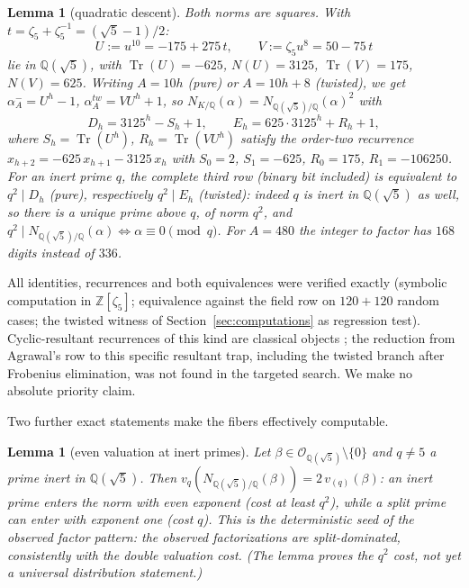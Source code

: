 \documentclass[11pt]{amsart}
\newtheorem{lemma}[theorem]{Lemma}
\theoremstyle{definition}
\theoremstyle{remark}
\newcommand{\Z}{\mathbb{Z}}
\newcommand{\Q}{\mathbb{Q}}
\begin{document}
\begin{lemma}[quadratic descent]\label{lem:descent}
Both norms are squares. With $t = \zeta_5 + \zeta_5^{-1} = (\sqrt5-1)/2$:
\[
U := u^{10} = -175 + 275\,t, \qquad V := \zeta_5 u^8 = 50 - 75\,t
\]
lie in $\Q(\sqrt5)$, with $\operatorname{Tr}(U) = -625$, $N(U) = 3125$,
$\operatorname{Tr}(V) = 175$, $N(V) = 625$. Writing $A = 10h$ (pure) or
$A = 10h + 8$ (twisted), we get $\alpha^-_A = U^h - 1$, $\alpha^{tw}_A =
V U^h + 1$, so $N_{K/\Q}(\alpha) = N_{\Q(\sqrt5)/\Q}(\alpha)^2$ with
\[
D_h = 3125^h - S_h + 1,
\qquad
E_h = 625 \cdot 3125^h + R_h + 1,
\]
where $S_h = \operatorname{Tr}(U^h)$, $R_h = \operatorname{Tr}(VU^h)$
satisfy the order-two recurrence $x_{h+2} = -625\,x_{h+1} - 3125\,x_h$
with $S_0 = 2$, $S_1 = -625$, $R_0 = 175$, $R_1 = -106250$. For an inert
prime $q$, the \emph{complete} third row (binary bit included) is
equivalent to $q^2 \mid D_h$ (pure), respectively $q^2 \mid E_h$
(twisted): indeed $q$ is inert in $\Q(\sqrt5)$ as well, so there is a
unique prime above $q$, of norm $q^2$, and
$q^2 \mid N_{\Q(\sqrt5)/\Q}(\alpha) \iff \alpha \equiv 0 \pmod q$. For
$A = 480$ the integer to factor has $168$ digits instead of $336$.
\end{lemma}

All identities, recurrences and both equivalences were verified exactly
(symbolic computation in $\Z[\zeta_5]$; equivalence against the field row
on $120 + 120$ random cases; the twisted witness of
Section~\ref{sec:computations} as regression test). Cyclic-resultant
recurrences of this kind are classical objects \cite{Hillar}; the
reduction from Agrawal's row to this specific resultant trap, including
the twisted branch after Frobenius elimination, was not found in the
targeted search. We make no absolute priority claim.

Two further exact statements make the fibers effectively computable.

\begin{lemma}[even valuation at inert primes]\label{lem:even}
Let $\beta \in \mathcal{O}_{\Q(\sqrt5)} \setminus \{0\}$ and $q \ne 5$ a
prime inert in $\Q(\sqrt5)$. Then $v_q(N_{\Q(\sqrt5)/\Q}(\beta)) =
2\,v_{(q)}(\beta)$: an inert prime enters the norm with even exponent
(cost at least $q^2$), while a split prime can enter with exponent one
(cost $q$). This is the deterministic seed of the observed factor
pattern: the observed factorizations are split-dominated, consistently
with the double valuation cost. (The lemma proves the $q^2$ cost, not
yet a universal distribution statement.)
\end{lemma}
\end{document}
